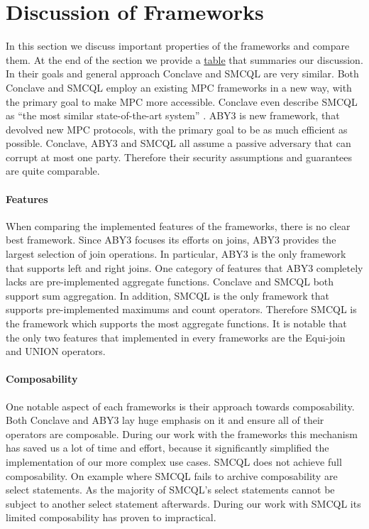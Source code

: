 \section{Discussion of Frameworks}
In this section we discuss important properties of the frameworks and compare them. 
At the end of the section we provide a \hyperref[Summary]{table} that summaries our discussion.
In their goals and general approach Conclave and SMCQL are very similar. Both Conclave and SMCQL employ an existing MPC frameworks in a new way, with the primary goal to make MPC more accessible. Conclave even describe SMCQL as ``the most similar state-of-the-art system'' \cite{10.1145/3302424.3303982}. ABY3 is new framework, that devolved new MPC protocols, with the primary goal to be as much efficient as possible. 
Conclave, ABY3 and SMCQL all assume a passive adversary that can corrupt at most one party. Therefore their security assumptions and guarantees are quite comparable. 
\paragraph{Features} 
When comparing the implemented features of the frameworks, there is no clear best framework. Since ABY3 focuses its efforts on joins, ABY3 provides the largest selection of join operations. In particular, ABY3 is the only framework that supports left and right joins. One category of features that ABY3 completely lacks are pre-implemented aggregate functions. Conclave and SMCQL both support sum aggregation. In addition, SMCQL is the only framework that supports pre-implemented maximums and count operators. Therefore SMCQL is the framework which supports the most aggregate functions. It is notable that the only two features that implemented in every frameworks are the Equi-join and UNION operators.  
\paragraph{Composability}
One notable aspect of each frameworks is their approach towards composability. Both Conclave and ABY3 lay huge emphasis on it and ensure all of their operators are composable. During our work with the frameworks this mechanism has saved us a lot of time and effort, because it significantly simplified the implementation of our more complex use cases.
SMCQL does not achieve full composability. On example where SMCQL fails to archive composability are select statements. As the majority of SMCQL's select statements cannot be subject to another select statement afterwards. During our work with SMCQL its limited composability has proven to impractical. 

